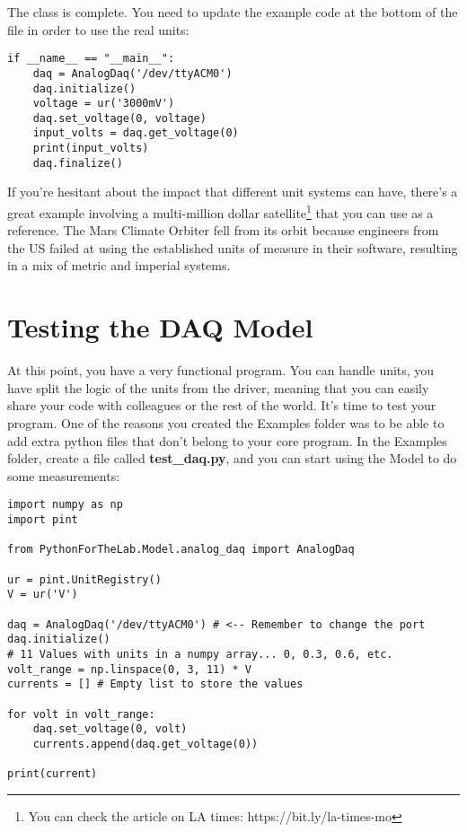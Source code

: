 The class is complete. You need to update the example code at the bottom of the file in order to use the real units:

\begin{verbatim}
if __name__ == "__main__":
    daq = AnalogDaq('/dev/ttyACM0')
    daq.initialize()
    voltage = ur('3000mV')
    daq.set_voltage(0, voltage)
    input_volts = daq.get_voltage(0)
    print(input_volts)
    daq.finalize()
\end{verbatim}

If you're hesitant about the impact that different unit systems can have, there's a great example involving a multi-million dollar satellite\footnote{You can check the article on LA times: https://bit.ly/la-times-mo} that you can use as a reference. The Mars Climate Orbiter fell from its orbit because engineers from the US failed at using the established units of measure in their software, resulting in a mix of metric and imperial systems.

\section{Testing the DAQ Model}\label{sec:testing-the-daq-model}
At this point, you have a very functional program. You can handle units, you have split the logic of the units from the driver, meaning that you can easily share your code with colleagues or the rest of the world. It's time to test your program. One of the reasons you created the Examples folder was to be able to add extra python files that don't belong to your core program. In the Examples folder, create a file called \textbf{test\_daq.py}, and you can start using the Model to do some measurements:

\begin{verbatim}
import numpy as np
import pint

from PythonForTheLab.Model.analog_daq import AnalogDaq

ur = pint.UnitRegistry()
V = ur('V')

daq = AnalogDaq('/dev/ttyACM0') # <-- Remember to change the port
daq.initialize()
# 11 Values with units in a numpy array... 0, 0.3, 0.6, etc.
volt_range = np.linspace(0, 3, 11) * V
currents = [] # Empty list to store the values

for volt in volt_range:
    daq.set_voltage(0, volt)
    currents.append(daq.get_voltage(0))

print(current)
\end{verbatim}

